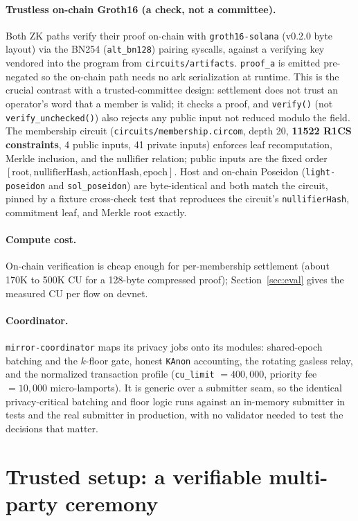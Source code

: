 \documentclass[10pt]{article}
\newcommand{\code}[1]{\texttt{#1}}
\begin{document}
\paragraph{Trustless on-chain Groth16 (a check, not a committee).} Both ZK paths
verify their proof on-chain with \code{groth16-solana} (v0.2.0 byte layout) via
the BN254 (\code{alt\_bn128}) pairing syscalls, against a verifying key vendored
into the program from \code{circuits/artifacts}. \code{proof\_a} is emitted
pre-negated so the on-chain path needs no ark serialization at runtime. This is
the crucial contrast with a trusted-committee design: settlement does not trust an
operator's word that a member is valid; it checks a proof, and \code{verify()}
(not \code{verify\_unchecked()}) also rejects any public input not reduced modulo
the field. The membership circuit (\code{circuits/membership.circom}, depth 20,
\textbf{11522 R1CS constraints}, 4 public inputs, 41 private inputs) enforces leaf
recomputation, Merkle inclusion, and the nullifier relation; public inputs are the
fixed order $[\text{root}, \text{nullifierHash}, \text{actionHash},
\text{epoch}]$. Host and on-chain Poseidon (\code{light-poseidon} and
\code{sol\_poseidon}) are byte-identical and both match the circuit, pinned by a
fixture cross-check test that reproduces the circuit's \code{nullifierHash},
commitment leaf, and Merkle root exactly.

\paragraph{Compute cost.} On-chain verification is cheap enough for
per-membership settlement (about 170K to 500K CU for a 128-byte compressed proof);
Section~\ref{sec:eval} gives the measured CU per flow on devnet.

\paragraph{Coordinator.} \code{mirror-coordinator} maps its privacy jobs onto its
modules: shared-epoch batching and the $k$-floor gate, honest \code{KAnon}
accounting, the rotating gasless relay, and the normalized transaction profile
(\code{cu\_limit} $=400{,}000$, priority fee $=10{,}000$ micro-lamports). It is
generic over a submitter seam, so the identical privacy-critical batching and
floor logic runs against an in-memory submitter in tests and the real submitter in
production, with no validator needed to test the decisions that matter.

\section{Trusted setup: a verifiable multi-party ceremony}
\label{sec:ceremony}
\end{document}
